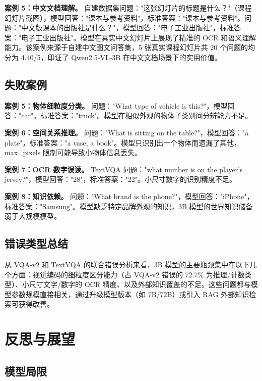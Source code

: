\documentclass{SYSUReport}
\begin{document}
\textbf{案例 5：中文文档理解。} 自建数据集问题："这张幻灯片的标题是什么？"（课程幻灯片截图），模型回答："课本与参考资料"，标准答案："课本与参考资料"。问题："中文版课本的出版社是什么？"，模型回答："电子工业出版社"，标准答案："电子工业出版社"。模型在真实中文幻灯片上展现了精准的 OCR 和语义理解能力。该案例来源于自建中文图文问答集，5 张真实课程幻灯片共 20 个问题的均分为 4.40/5，印证了 Qwen2.5-VL-3B 在中文文档场景下的实用价值。

\subsection{失败案例}

\textbf{案例 5：物体细粒度分类。} 问题："What type of vehicle is this?"，模型回答："car"，标准答案："truck"。模型在相似外观的物体子类别间分辨能力不足。

\textbf{案例 6：空间关系推理。} 问题："What is sitting on the table?"，模型回答："a plate"，标准答案："a vase, a book"。模型只识别出一个物体而遗漏了其他，max\_pixels 限制可能导致小物体信息丢失。

\textbf{案例 7：OCR 数字误读。} TextVQA 问题："what number is on the player's jersey?"，模型回答："28"，标准答案："22"。小尺寸数字的识别精度不足。

\textbf{案例 8：知识依赖。} 问题："What brand is the phone?"，模型回答："iPhone"，标准答案："Samsung"。模型缺乏特定品牌外观的知识，3B 模型的世界知识储备弱于大规模模型。

\subsection{错误类型总结}

从 VQA-v2 和 TextVQA 的联合错误分析来看，3B 模型的主要瓶颈集中在以下几个方面：视觉编码的细粒度区分能力（占 VQA-v2 错误的 72.7\% 为推理/计数类型）、小尺寸文字/数字的 OCR 精度、以及外部知识覆盖的不足。这些问题都与模型参数规模直接相关，通过升级模型版本（如 7B/72B）或引入 RAG 外部知识检索可获得改善。

\section{反思与展望}

\subsection{模型局限}
\end{document}
